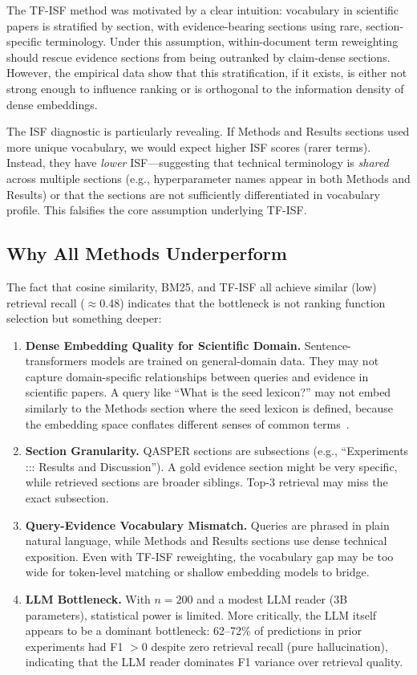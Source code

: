 \documentclass[11pt,letterpaper]{article}
\begin{document}
The TF-ISF method was motivated by a clear intuition: vocabulary in scientific
papers is stratified by section, with evidence-bearing sections using rare,
section-specific terminology. Under this assumption, within-document term
reweighting should rescue evidence sections from being outranked by claim-dense
sections. However, the empirical data show that this stratification, if it exists,
is either not strong enough to influence ranking or is orthogonal to the
information density of dense embeddings.

The ISF diagnostic is particularly revealing. If Methods and Results sections used
more unique vocabulary, we would expect higher ISF scores (rarer terms). Instead,
they have \emph{lower} ISF—suggesting that technical terminology is \emph{shared}
across multiple sections (e.g., hyperparameter names appear in both Methods and
Results) or that the sections are not sufficiently differentiated in vocabulary
profile. This falsifies the core assumption underlying TF-ISF.

\subsection{Why All Methods Underperform}

The fact that cosine similarity, BM25, and TF-ISF all achieve similar (low)
retrieval recall ($\approx$0.48) indicates that the bottleneck is not ranking
function selection but something deeper:

\begin{enumerate}
  \item \textbf{Dense Embedding Quality for Scientific Domain.}
  Sentence-transformers models are trained on general-domain data. They may not
  capture domain-specific relationships between queries and evidence in scientific
  papers. A query like ``What is the seed lexicon?'' may not embed similarly to
  the Methods section where the seed lexicon is defined, because the embedding
  space conflates different senses of common terms~\citep{Reichman2024}.

  \item \textbf{Section Granularity.}
  QASPER sections are subsections (e.g., ``Experiments ::: Results and
  Discussion''). A gold evidence section might be very specific, while retrieved
  sections are broader siblings. Top-3 retrieval may miss the exact subsection.

  \item \textbf{Query-Evidence Vocabulary Mismatch.}
  Queries are phrased in plain natural language, while Methods and Results sections
  use dense technical exposition. Even with TF-ISF reweighting, the vocabulary
  gap may be too wide for token-level matching or shallow embedding models to
  bridge.

  \item \textbf{LLM Bottleneck.}
  With $n{=}200$ and a modest LLM reader (3B parameters), statistical power is
  limited. More critically, the LLM itself appears to be a dominant bottleneck:
  62–72\% of predictions in prior experiments had F1 $> 0$ despite zero retrieval
  recall (pure hallucination), indicating that the LLM reader dominates F1
  variance over retrieval quality.
\end{enumerate}
\end{document}
